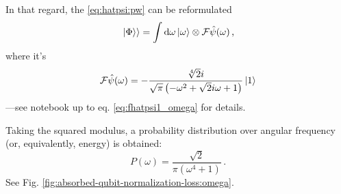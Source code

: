 In that regard, the \eqref{eq:hatpsi:pw} can be reformulated
\begin{equation}
  \left.\left| \Phi \right\rangle\right\rangle = \int \dd{\omega} \ket{\omega} \otimes \mathcal{F} \hat{\psi} (\omega) \,\text{,}
\end{equation}
where it's
\begin{equation}
  \mathcal{F} \hat{\psi} (\omega) = - \frac{\sqrt[4]{2} i}{\sqrt{\pi} \left(- \omega^{2} + \sqrt{2} i \omega + 1\right)} \ket{1}
\end{equation}
---see notebook up to eq. \eqref{eq:fhatpsi1_omega} for details.

Taking the squared modulus, a probability distribution over angular frequency
(or, equivalently, energy) is obtained:
\[
  P(\omega) = \frac{\sqrt{2}}{\pi \left(\omega^{4} + 1\right)}
  \,\text{.}
\]
See Fig. \ref{fig:absorbed-qubit-normalization-loss:omega}.